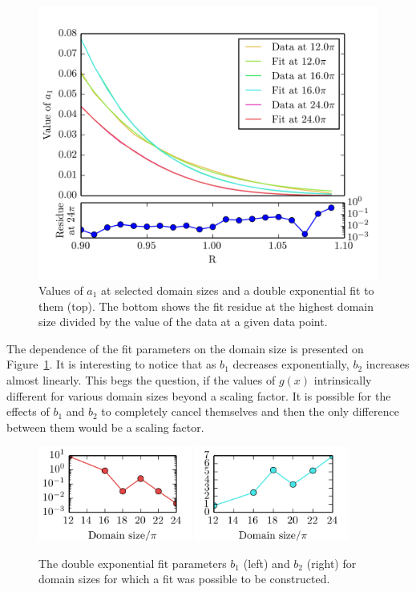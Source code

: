 \documentclass[11pt,a4paper]{article}
\begin{document}
\begin{figure}[h!]
    \centering
    \includegraphics[width=\textwidth]{double_exp_fit}
    \caption{Values of $a_1$ at selected domain sizes and a double exponential fit to them (top). The bottom shows the fit residue at the highest domain size divided by the value of the data at a given data point.}
\end{figure}

The dependence of the fit parameters on the domain size is presented on Figure~\ref{img:b_params}.
It is interesting to notice that as $b_1$ decreases exponentially, $b_2$ increases almost linearly.
This begs the question, if the values of $g(x)$ intrinsically different for various domain sizes beyond a scaling factor.
It is possible for the effects of $b_1$ and $b_2$ to completely cancel themselves and then the only difference between them would be a scaling factor.

\begin{figure}[h!]
    \centering
    \includegraphics[width=0.45\textwidth]{b1_vs_domain.png}
    \includegraphics[width=0.45\textwidth]{b2_vs_domain.png}
    \caption{The double exponential fit parameters $b_1$ (left) and $b_2$ (right) for domain sizes for which a fit was possible to be constructed.}\label{img:b_params}
\end{figure}
\end{document}
